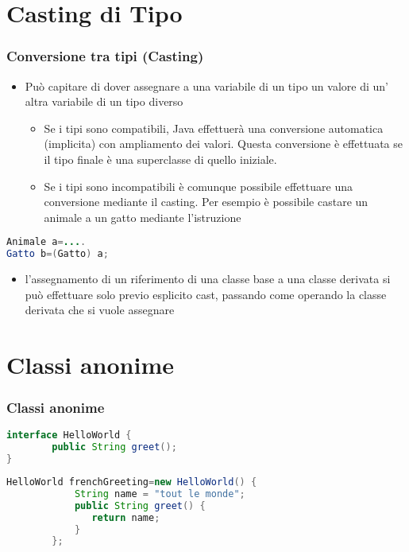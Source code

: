\documentclass{beamer}
\begin{document}
\section{Casting di Tipo}
\begin{frame}[fragile]
\frametitle{Conversione tra tipi (Casting)}
\begin{itemize}
\item Pu\`o capitare di dover assegnare a una variabile di un tipo un valore di un' altra variabile di un tipo diverso
\begin{itemize}
\item Se i tipi sono compatibili, Java effettuerà una conversione automatica (implicita) con ampliamento dei valori. Questa conversione \`e effettuata se il tipo finale \`e una superclasse di quello iniziale. 
\item Se i tipi sono incompatibili \`e comunque possibile effettuare una conversione mediante il casting. Per esempio \`e possibile castare un animale a un gatto mediante l'istruzione
\end{itemize}

\end{itemize}
\begin{lstlisting}[language=Java,escapechar=|]
Animale a=....
Gatto b=(Gatto) a;
\end{lstlisting}
\begin{itemize}
 \item l'assegnamento di un riferimento di una classe base a una classe derivata si pu\`o effettuare solo previo esplicito cast, passando come operando la classe derivata che si vuole assegnare
\end{itemize}
\end{frame}

\section{Classi anonime}

\begin{frame}[fragile]
\frametitle{Classi anonime }

\begin{lstlisting}[language=Java,escapechar=|]
 interface HelloWorld {
        public String greet();
}
\end{lstlisting}

\begin{lstlisting}[language=Java,escapechar=|]
 HelloWorld frenchGreeting=new HelloWorld() {
            String name = "tout le monde";
            public String greet() {
               return name;
            }
        };
\end{lstlisting}
\end{frame}
\end{document}
